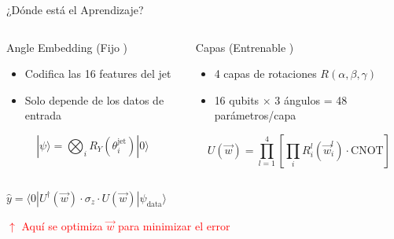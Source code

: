 \documentclass[aspectratio=43]{beamer}
\begin{document}
\begin{frame}{¿Dónde está el Aprendizaje?}
  \begin{columns}
    \begin{column}{0.49\textwidth}
      \begin{block}{Angle Embedding (Fijo )}
        \begin{itemize}
          \item Codifica las 16 features del jet
          \item Solo depende de los datos de entrada
        \end{itemize}
        $$|\psi\rangle = \bigotimes_i R_Y(\theta_i^{\text{jet}})|0\rangle$$
      \end{block}
    \end{column}
    
    \begin{column}{0.49\textwidth}
      \begin{alertblock}{Capas (Entrenable )}

        \begin{itemize}
          \item 4 capas de rotaciones $R(\alpha, \beta, \gamma)$
          \item 16 qubits $\times$ 3 ángulos = 48 parámetros/capa
        \end{itemize}
        $$U(\vec{w}) = \prod_{l=1}^{4} \left[\prod_i R_i^l(\vec{w}_i^l) \cdot \text{CNOT}\right]$$
      \end{alertblock}
    \end{column}
  \end{columns}
  
  \vspace{1em}
  \begin{center}
    \Large
    $\hat{y} = \langle 0 | U^\dagger(\vec{w}) \cdot \sigma_z \cdot U(\vec{w}) | \psi_{\text{data}} \rangle$
    
    \textcolor{red}{$\uparrow$ Aquí se optimiza $\vec{w}$ para minimizar el error}
  \end{center}
\end{frame}
\end{document}

